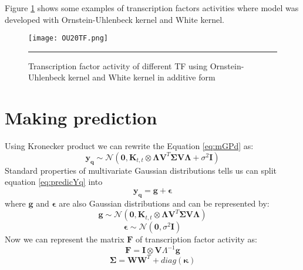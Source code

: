 Figure \ref{fig:TFA_of_20TF} shows some examples of transcription factors activities where
 model was developed with Ornstein-Uhlenbeck kernel and White kernel.

\begin{figure}[t]
	\centering
		\texttt{[image: OU20TF.png]}
		\rule{35em}{0.5pt}
	\caption[Transcription factor activity of different TF using Ornstein-Uhlenbeck kernel and White kernel]
		{Transcription factor activity of different TF using Ornstein-Uhlenbeck kernel and 
		White kernel in additive form}
	\label{fig:TFA_of_20TF}
\end{figure}


\section{Making prediction}
Using Kronecker product we can rewrite the Equation \ref{eq:mGPd} as:
\begin{equation} \label{eq:predicYq}
  \mathbf{y_q}  \sim \mathcal{N} \left( \mathbf{0}, 
    \mathbf{K}_{t,t} \otimes \boldsymbol{\Lambda} \mathbf{V}^T\boldsymbol{\Sigma} \mathbf{V} \boldsymbol{\Lambda} +
    \sigma^2\mathbf{I}\right)
\end{equation}
Standard properties of multivariate Gaussian distributions tells us can split equation \ref{eq:predicYq} into
\begin{equation} \label{eq:gEp}
  \mathbf{y_q} = \mathbf{g} + \boldsymbol{\epsilon}
\end{equation}
where $\mathbf{g}$ and $\boldsymbol{\epsilon}$ are also Gaussian distributions and can be represented by:
\begin{equation}\label{eq:g}
  \mathbf{g} \sim \mathcal{N} \left( \mathbf{0}, 
    \mathbf{K}_{t,t} \otimes 
    \boldsymbol{\Lambda} \mathbf{V}^T\boldsymbol{\Sigma} \mathbf{V} \boldsymbol{\Lambda} \right)
\end{equation}
\begin{equation}\label{eq:Epsi}
  \boldsymbol{\epsilon} \sim \mathcal{N} \left(\mathbf{0},\sigma^2\mathbf{I}\right)
\end{equation}
Now we can represent the matrix $\mathbf{F}$ of transcription factor activity as:
\begin{equation}\label{eq:F}
  \mathbf{F} = \mathbf{I} \otimes \mathbf{V} \Lambda^{-1} \mathbf{g}
\end{equation}
\begin{equation}\label{eq:Sigma}
  \boldsymbol{\Sigma} = \mathbf{W}\mathbf{W}^T + diag\left(\boldsymbol{\kappa}\right)
\end{equation}
